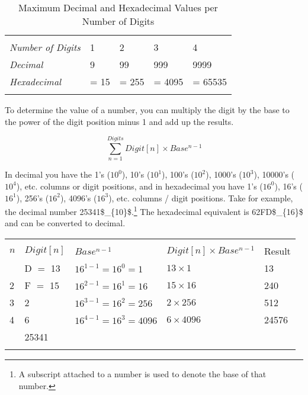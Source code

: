 \begin{table}[H]
  \centering
  \begin{tabu}{ X[11,l,m] X[9,r,m] X[9,r,m] X[9,r,m] X[9,r,m] }
    \thrule
     \\ \mdrule
    \textit{Number of Digits} & \num{1} & \num{2} & \num{3} & \num{4} \\ \mrule
    \textit{Decimal} & \num{9} & \num{99} & \num{999} & \num{9999} \\ 
    \textit{Hexadecimal} &  = \num{15} &  = \num{255}
      &  = \num{4095} &  = \num{65535} \\
    \bhrule
  \end{tabu}
  \caption{Maximum Decimal and Hexadecimal Values per Number of Digits}
\end{table}

To determine the value of a number, you can multiply the digit by the base to
the power of the digit position minus 1 and add up the results.

\begin{equation}
  \sum_{n=1}^{Digits} Digit[n] \times Base^{n-1}
\end{equation}

\par\medskip

In decimal you have the 1's ($10^{0}$), 10's ($10^{1}$), 100's ($10^{2}$),
1000's ($10^{3}$), 10000's ($10^{4}$), etc. columns or digit positions, and
in hexadecimal you have 1's ($16^{0}$), 16's ($16^{1}$), 256's ($16^{2}$),
4096's ($16^{3}$), etc. columns / digit positions.  Take for example, the
decimal number \num{25341$_{10}$}.\footnote{A subscript attached to a number is used
to denote the base of that number.} The hexadecimal equivalent is
\num{62FD$_{16}$} and can be converted to decimal.

\begin{table}[H]
  \centering
  \begin{tabu}{ X[1,c,m] | X[2,r,m] | X[3,r,m] | X[3,r,m] | X[2,r,m] }
    \thrule
     \\
    \mrule
    $n$ & $Digit[n]$ & $Base^{n-1}$ & $Digit[n] \times Base^{n-1}$ & Result \\
     & D $=$ 13 & $16^{1-1} = 16^{0} = 1$ & $13 \times 1$ & 13 \\ 
    2 & F $=$ 15 & $16^{2-1} = 16^{1} = 16$ & $15 \times 16$ & 240 \\ 
    3 & 2 & $16^{3-1} = 16^{2} = 256$ & $2 \times 256$ & 512 \\ 
    4 & 6 & $16^{4-1} = 16^{3} = 4096$ & $6 \times 4096$ & 24576 \\
    \mrule
     & 25341 \\
    \bhrule
  \end{tabu}
\end{table}

